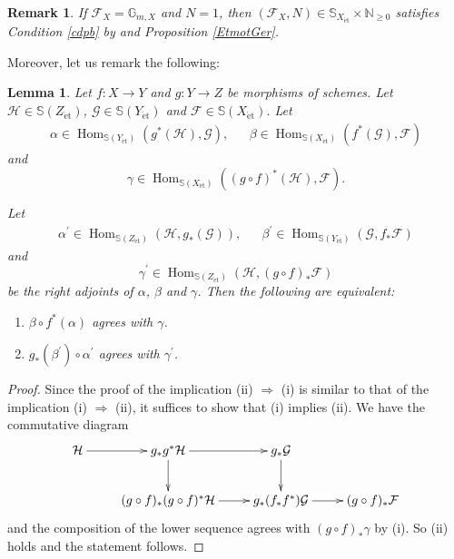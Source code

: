 \documentclass{article}
\newtheorem{lem}[thm]{\indent \sc Lemma}
\newtheorem{rem}[thm]{\indent \sc Remark}
\newcommand{\et}{\mathrm{\acute{e}t}}
\begin{document}
%
\begin{rem}\upshape\label{ExaCond2}
If $\mathcal{F}_{X}=\mathbb{G}_{m, X}$ and $N=1$, then
$(\mathcal{F}_{X}, N)\in \mathbb{S}_{X_{\et}}\times \mathbb{N}_{\geq 0}$ 
satisfies Condition \ref{cdpb} by \cite[p.116, III, Remark 3.11 (a)]{M}
and Proposition \ref{EtmotGer}.    
\end{rem}
%



Moreover, let us remark the following:
%
\begin{lem}\upshape\label{adfun}
Let $f: X\to Y$ and $g: Y\to Z$ be morphisms of schemes. Let
$\mathcal{H}\in \mathbb{S}(Z_{\et})$,
$\mathcal{G}\in \mathbb{S}(Y_{\et})$
and
$\mathcal{F}\in \mathbb{S}(X_{\et})$.
Let
%
\begin{align*}
\alpha\in \operatorname{Hom}_{\mathbb{S}(Y_{\et})}(g^{*}(\mathcal{H}), \mathcal{G}),
&&
\beta\in \operatorname{Hom}_{\mathbb{S}(X_{\et})}(f^{*}(\mathcal{G}), \mathcal{F})
\end{align*}
%
and
%
\begin{equation*}
\gamma\in \operatorname{Hom}_{\mathbb{S}(X_{\et})}((g\circ f)^{*}(\mathcal{H}), \mathcal{F}).
\end{equation*}
%

Let 
%
\begin{align*}
\alpha^{\prime}\in \operatorname{Hom}_{\mathbb{S}(Z_{\et})}(\mathcal{H}, g_{*}(\mathcal{G})),
&&
\beta^{\prime}\in \operatorname{Hom}_{\mathbb{S}(Y_{\et})}(\mathcal{G}, f_{*}\mathcal{F})
\end{align*}
%
and 
%
\begin{equation*}
\gamma^{\prime}\in\operatorname{Hom}_{\mathbb{S}(Z_{\et})}(\mathcal{H}, (g\circ f)_{*}\mathcal{F})
\end{equation*}
%
be the right adjoints of $\alpha$, $\beta$ and $\gamma$. Then the following are equivalent:
%
\begin{enumerate}
%
\item[(i)] 
$\beta\circ f^{*}(\alpha)$
agrees with $\gamma$.
%
\item[(ii)]
$g_{*}(\beta^{\prime})\circ \alpha^{\prime}$
agrees with $\gamma^{\prime}$.
\end{enumerate}
%
\end{lem}
%
%
\begin{proof}\upshape
Since the proof of the implication (ii) $\Rightarrow$ (i)
is similar to that of the implication (i) $\Rightarrow$ (ii), 
it suffices to show that (i) implies (ii).
We have the commutative diagram
%
\begin{equation*}
\xymatrix{
\mathcal{H}
\ar[r]
&
g_{*}g^{*}\mathcal{H}
\ar[r]\ar[d]
&
g_{*}\mathcal{G} 
\ar[d]
\\
&
(g\circ f)_{*}(g\circ f)^{*}
\mathcal{H}
\ar[r]
&
g_{*}(f_{*}f^{*})\mathcal{G}
\ar[r]
&
(g\circ f)_{*}\mathcal{F}
}    
\end{equation*}
%
and the composition of the lower sequence agrees with $(g\circ f)_{*}\gamma$ by (i).
So (ii) holds and the statement follows.
\end{proof}
\end{document}
